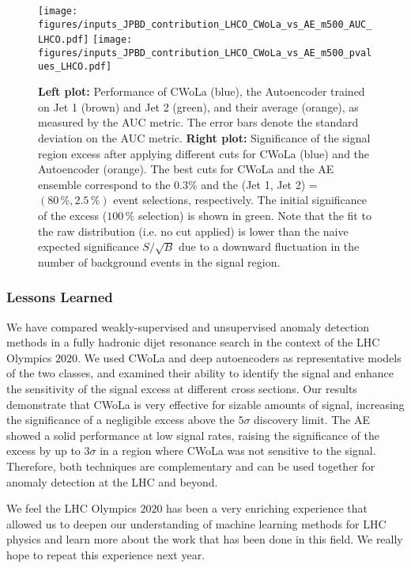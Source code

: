\documentclass[a4paper,11pt]{article}
\begin{document}
\begin{figure}[h!]
\centering
\texttt{[image: figures/inputs\_JPBD\_contribution\_LHCO\_CWoLa\_vs\_AE\_m500\_AUC\_LHCO.pdf]}
\hspace{5pt}
\texttt{[image: figures/inputs\_JPBD\_contribution\_LHCO\_CWoLa\_vs\_AE\_m500\_pvalues\_LHCO.pdf]}
\caption{\textbf{Left plot:} Performance of CWoLa (blue), the Autoencoder trained on Jet 1 (brown) and Jet 2 (green), and their average (orange), as measured by the AUC metric. The error bars denote the standard deviation on the AUC metric. \textbf{Right plot:} Significance of the signal region excess after applying different cuts for CWoLa (blue) and the Autoencoder (orange). The best cuts for CWoLa and the AE ensemble correspond to the $0.3 \%$ and the (Jet 1, Jet 2) = $(80 \, \%, 2.5 \, \%)$ event selections, respectively. The initial significance of the excess ($100 \, \%$ selection) is shown in green. Note that the fit to the raw distribution (i.e. no cut applied) is lower than the naive expected significance $S/\sqrt B$ due to a downward fluctuation in the number of background events in the signal region.}
\label{fig:PMCWoLa_vs_AE}
\end{figure}




\subsubsection{Lessons Learned}
\label{sec:lessons}

We have compared weakly-supervised and unsupervised anomaly detection methods in a fully hadronic dijet resonance search in the context of the LHC Olympics $2020$. We used CWoLa and deep autoencoders as representative models of the two classes, and examined their ability to identify the signal and enhance the sensitivity of the signal excess at different cross sections. Our results demonstrate that CWoLa is very effective for sizable amounts of signal, increasing the significance of a negligible excess above the $5\sigma$ discovery limit. The AE showed a solid performance at low signal rates, raising the significance of the excess by up to $3\sigma$ in a region where CWoLa was not sensitive to the signal. Therefore, both techniques are complementary and can be used together for anomaly detection at the LHC and beyond.

We feel the LHC Olympics $2020$ has been a very enriching experience that allowed us to deepen our understanding of machine learning methods for LHC physics and learn more about the work that has been done in this field. We really hope to repeat this experience next year.
\end{document}
